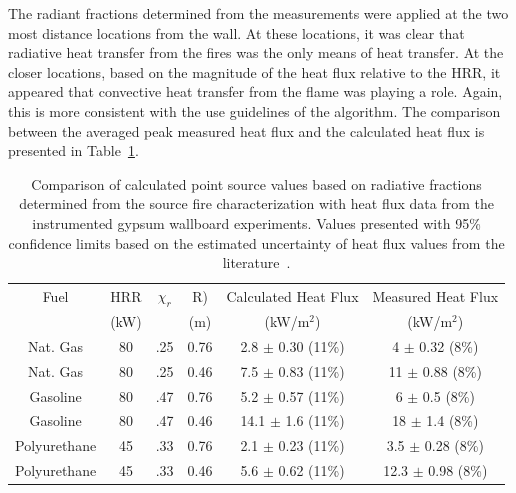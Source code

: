 \documentclass[twoside]{uocthesis}
\begin{document}
{The radiant fractions determined from the measurements were applied at the two most distance locations from the wall.  At these locations, it was clear that radiative heat transfer from the fires was the only means of heat transfer.  At the closer locations, based on the magnitude of the heat flux relative to the HRR, it appeared that convective heat transfer from the flame was playing a role.  Again, this is more consistent with the use guidelines of the algorithm. The comparison between the averaged peak measured heat flux and the calculated heat flux is presented in Table~\ref{tab:Point_Source_ModChir}. 

\begin{table}
	\centering
	\footnotesize
	\begin{tabular}{|c|c|c|c|c|c|}
	\hline
		Fuel 		& HRR  &   $\chi_r$   & R)	     & Calculated Heat Flux      & Measured Heat Flux      \\     
					& (kW) &  			  & (m)		&  (kW/m$^2$)				&   (kW/m$^2$)                        \\ \hline 
		Nat. Gas 	& 80       &   .25 	& 0.76 	     & 2.8 $\pm$ 0.30 (11\%) 				&  4 $\pm$ 0.32 (8\%) 	   	 \\
		Nat. Gas 	& 80       &   .25  & 0.46	     & 7.5 $\pm$ 0.83 (11\%) 				&  11 $\pm$ 0.88 (8\%)  	     \\
		Gasoline 	& 80       &   .47 	& 0.76	     & 5.2 $\pm$ 0.57 (11\%) 				&  6 $\pm$ 0.5 (8\%)   	      \\
        Gasoline 	& 80       &   .47 	& 0.46	     & 14.1 $\pm$ 1.6 (11\%) 				&  18 $\pm$ 1.4 (8\%)		      \\
       Polyurethane & 45       &   .33 	& 0.76	     & 2.1 $\pm$ 0.23 (11\%) 				&  3.5 $\pm$ 0.28 (8\%)   	       \\
       Polyurethane & 45       &   .33 	& 0.46	     & 5.6 $\pm$ 0.62 (11\%) 				& 12.3 $\pm$ 0.98 (8\%)   	       \\
	\hline
	\end{tabular}
	\caption[Comparison of calculated point source values based on radiative fractions determined from the source fire characterization with heat flux data from the instrumented gypsum wallboard experiments]{Comparison of calculated point source values based on radiative fractions determined from the source fire characterization with heat flux data from the instrumented gypsum wallboard experiments.  Values presented with 95\% confidence limits based on the estimated uncertainty of heat flux values from the literature~\cite{Bryant:2003,Pitts:2006}.}
	\label{tab:Point_Source_ModChir}
\end{table}

}
\end{document}
